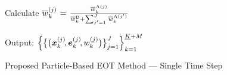 \documentclass[11pt,a4paper]{article}
\newcommand{\ist}{\hspace*{.3mm}}
\newcommand{\rmv}{\hspace*{-.3mm}}
\begin{document}
\begin{algorithm}
{{{Calculate $\overline{w}^{(j)}_{k} \ist=\ist \frac{\overline{w}^{\hspace{.15mm}\text{A}(j)}_{k}}{\overline{w}^{\text{B}}_{k}+\sum^{J}_{j'=1} \ist \overline{w}^{\hspace{.15mm}\text{A}(j')}_{k}}$
}

}
\vspace{1mm}

}
\vspace{1mm}

Output: $\Big\{  \big\{ \big( \V{x}^{(j)}_{k}\rmv\rmv, \V{e}^{(j)}_{k}\rmv\rmv, w^{(j)}_{k} \big) \big\}_{j=1}^{J} \Big\}_{k=1}^{\underline{K} +M}$

\caption{Proposed Particle-Based EOT Method --- Single Time Step}
\label{al:totalEOT1}
\end{algorithm}

\pagebreak





\end{document}
